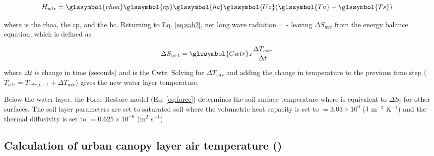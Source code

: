 \documentclass[final,3p,times,authoryear]{elsarticle}
\begin{document}
\begin{equation} 
H_{wtr} = \glssymbol{rhoa} \glssymbol{cp} \glssymbol{hc} \glssymbol{Uz} (\glssymbol{Ta}-\glssymbol{Ts})
\label{eq:hwtr} \end{equation} 


where  is the \glsdesc{rhoa},  the \glsdesc{cp}, and  the \glsdesc{hc}. Returning to Eq. \ref{eq:sab2}, net long wave radiation  =  -  leaving $\Delta S_{wrt}$ from the energy balance equation, which is defined as \citep{MolinaMartinez2006}

\begin{equation} 
\Delta S_{wrt} = \glssymbol{Cwtr} z \frac{\Delta T_{wtr}}{\Delta t}
\label{eq:swrt} \end{equation}



where $\Delta t$ is change in time (seconds) and  is the \glsdesc{Cwtr}. Solving for $\Delta T_{wtr}$ and adding the change in temperature to the previous time step ($T_{wtr} = T_{wtr,t-1}  + \Delta T_{wtr}$) gives the new water layer temperature. 


Below the water layer, the Force-Restore model (Eq. \ref{eq:force}) determines the soil surface temperature where  is equivalent to $\Delta S_{i}$  for other surfaces. The soil layer parameters are set to saturated soil where the volumetric heat capacity is set to  $= 3.03 \times 10^{6}$ (J m$^{-2}$ K$^{-1}$) and the thermal diffusivity is set to  $= 0.625 \times 10^{-6}$ (m$^{2}$ s$^{-1}$). 


\subsection{Calculation of urban canopy layer air temperature () }\label{sec:calcTac}
\end{document}
